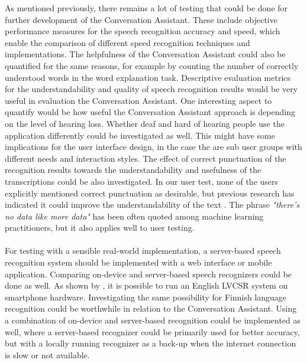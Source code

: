 \documentclass[english, 12pt, a4paper, pdftex, elec, utf8]{aaltothesis}
\begin{document}
As mentioned previously, there remains a lot of testing that could be done for further development of the Conversation Assistant. These include objective performance measures for the speech recognition accuracy and speed, which enable the comparison of different speed recognition techniques and implementations. The helpfulness of the Conversation Assistant could also be quantified for the same reasons, for example by counting the number of correctly understood words in the word explanation task. Descriptive evaluation metrics for the understandability and quality of speech recognition results would be very useful in evaluation the Conversation Assistant. One interesting aspect to quantify would be how useful the Conversation Assistant approach is depending on the level of hearing loss. Whether deaf and hard of hearing people use the application differently could be investigated as well. This might have some implications for the user interface design, in the case the are sub user groups with different needs and interaction styles. The effect of correct punctuation of the recognition results towards the understandability and usefulness of the transcriptions could be also investigated. In our user test, none of the users explicitly mentioned correct punctuation as desirable, but previous research has indicated it could improve the understandability of the text \cite{prietch2015application}. The phrase \textit{"there's no data like more data"} has been often quoted among machine learning practitioners, but it also applies well to user testing. \\\\ 
For testing with a sensible real-world implementation, a server-based speech recognition system should be implemented with a web interface or mobile application. Comparing on-device and server-based speech recognizers could be done as well. As shown by \cite{mcgraw2016personalized}, it is possible to run an English LVCSR system on smartphone hardware. Investigating the same possibility for Finnish language recognition could be worthwhile in relation to the Conversation Assistant. Using a combination of on-device and server-based recognition could be implemented as well, where a server-based recognizer could be primarily used for better accuracy, but with a locally running recognizer as a back-up when the internet connection is slow or not available. \\\\
\end{document}
